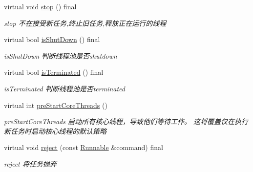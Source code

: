 \begin{DoxyCompactItemize}
virtual void \hyperlink{classThreadPoolExecutor_a588ec33baf402afd0e1c52b11d9234da}{stop} () final
\begin{DoxyCompactList}\small\item\em stop 不在接受新任务,终止旧任务,释放正在运行的线程 \end{DoxyCompactList}\item 
virtual bool \hyperlink{classThreadPoolExecutor_ac33c356670eabe5345992331e615348c}{is\+Shut\+Down} () final
\begin{DoxyCompactList}\small\item\em is\+Shut\+Down 判断线程池是否shutdown \end{DoxyCompactList}\item 
virtual bool \hyperlink{classThreadPoolExecutor_a89ed68d6c67ad6fbde73b7883c8107a7}{is\+Terminated} () final
\begin{DoxyCompactList}\small\item\em is\+Terminated 判断线程池是否terminated \end{DoxyCompactList}\item 
virtual int \hyperlink{classThreadPoolExecutor_aab8b3946a87fbecd144b159c12c8bcfb}{pre\+Start\+Core\+Threads} ()
\begin{DoxyCompactList}\small\item\em pre\+Start\+Core\+Threads 启动所有核心线程，导致他们等待工作。 这将覆盖仅在执行新任务时启动核心线程的默认策略 \end{DoxyCompactList}\item 
virtual void \hyperlink{classThreadPoolExecutor_a14c4e3d786dcf22e858b11a95d2f77ef}{reject} (const \hyperlink{classRunnable}{Runnable} \&command) final
\begin{DoxyCompactList}\small\item\em reject 将任务抛弃 \end{DoxyCompactList}\end{DoxyCompactItemize}
